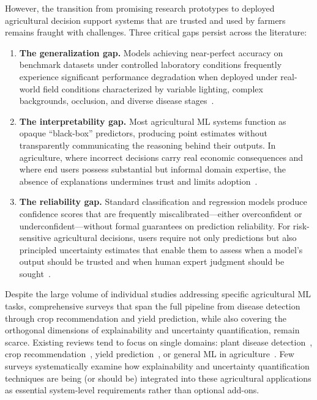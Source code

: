 \documentclass[journal]{IEEEtran}
\begin{document}
However, the transition from promising research prototypes to deployed agricultural decision support systems that are trusted and used by farmers remains fraught with challenges. Three critical gaps persist across the literature:

\begin{enumerate}[leftmargin=*]
  \item \textbf{The generalization gap.} Models achieving near-perfect accuracy on benchmark datasets under controlled laboratory conditions frequently experience significant performance degradation when deployed under real-world field conditions characterized by variable lighting, complex backgrounds, occlusion, and diverse disease stages~\cite{barbedo2018factors,barbedo2019plant}.
  
  \item \textbf{The interpretability gap.} Most agricultural ML systems function as opaque ``black-box'' predictors, producing point estimates without transparently communicating the reasoning behind their outputs. In agriculture, where incorrect decisions carry real economic consequences and where end users possess substantial but informal domain expertise, the absence of explanations undermines trust and limits adoption~\cite{arrieta2020explainable,samek2021explaining}.
  
  \item \textbf{The reliability gap.} Standard classification and regression models produce confidence scores that are frequently miscalibrated---either overconfident or underconfident---without formal guarantees on prediction reliability. For risk-sensitive agricultural decisions, users require not only predictions but also principled uncertainty estimates that enable them to assess when a model's output should be trusted and when human expert judgment should be sought~\cite{guo2017calibration,abdar2021review}.
\end{enumerate}

Despite the large volume of individual studies addressing specific agricultural ML tasks, comprehensive surveys that span the full pipeline from disease detection through crop recommendation and yield prediction, while also covering the orthogonal dimensions of explainability and uncertainty quantification, remain scarce. Existing reviews tend to focus on single domains: plant disease detection~\cite{saleem2019plant,li2021review,thakur2022trends}, crop recommendation~\cite{pudumalar2017crop}, yield prediction~\cite{vanklompenburg2020crop,chlingaryan2018machine}, or general ML in agriculture~\cite{liakos2018machine,benos2021machine}. Few surveys systematically examine how explainability and uncertainty quantification techniques are being (or should be) integrated into these agricultural applications as essential system-level requirements rather than optional add-ons.
\end{document}
